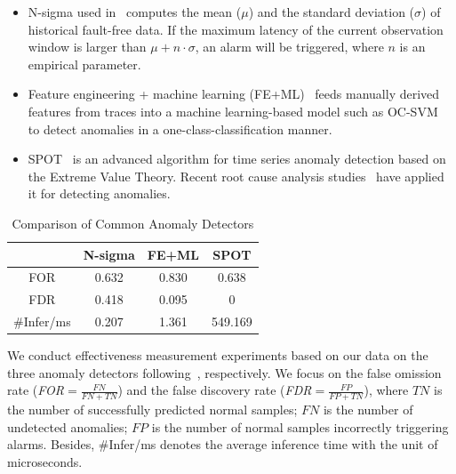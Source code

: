 \begin{itemize}[leftmargin=12pt, topsep=0pt]
\item N-sigma used in~\cite{MicroRank, MicroScope} computes the mean ($\mu$) and the standard deviation ($\sigma$) of historical fault-free data. If the maximum latency of the current observation window is larger than $\mu+n\cdot \sigma$, an alarm will be triggered, where $n$ is an empirical parameter.

\item Feature engineering + machine learning (FE+ML)~\cite{MicroHECL, AutoMAP} feeds manually derived features from traces into a machine learning-based model such as OC-SVM~\cite{MicroHECL} to detect anomalies in a one-class-classification manner. 

\item SPOT~\cite{SPOT} is an advanced algorithm for time series anomaly detection based on the Extreme Value Theory. Recent root cause analysis studies~\cite{DyCause, MicroCause} have applied it for detecting anomalies.

\end{itemize}
\begin{table}[htbp]
\vspace{-0.1in}
\small
\centering
\caption{Comparison of Common Anomaly Detectors}
\begin{tabular}{cccc}
\toprule
& \textbf{N-sigma} & \textbf{FE+ML} & \textbf{SPOT} \\
\midrule
FOR & 0.632 & 0.830 & 0.638\\
FDR & 0.418 & 0.095 & 0\\
\#Infer/ms & 0.207 & 1.361 & 549.169\\
\bottomrule
\end{tabular}
\vspace{-0.1in}
\label{tab:fault-detection}
\end{table}

We conduct effectiveness measurement experiments based on our data on the three anomaly detectors following~\cite{MicroRank, MicroHECL, DyCause}, respectively. We focus on the false omission rate (\textit{FOR}$=\frac{FN}{FN+TN}$) and the false discovery rate (\textit{FDR}$=\frac{FP}{FP+TN}$), where
$TN$ is the number of successfully predicted normal samples; 
$FN$ is the number of undetected anomalies;
$FP$ is the number of normal samples incorrectly triggering alarms.
Besides, \#Infer/ms denotes the average inference time with the unit of microseconds.

